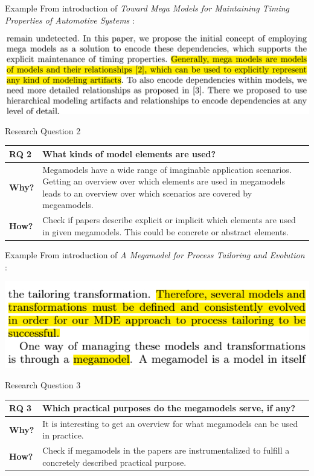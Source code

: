 \documentclass{beamer}
\begin{document}
\begin{frame}{Example}
From introduction of \textit{Toward Mega Models for Maintaining Timing Properties of Automotive Systems} \cite{Neumann_models2010}:
\begin{center}
\includegraphics[width=1.0\textwidth]{ex_rq1}
\end{center}
\end{frame}

\begin{frame}{Research Question 2}
\begin{tabular}{|l|p{9cm}|}\hline
\textbf{RQ 2} & What kinds of model elements are used?\\\hline
\textbf{Why?} & Megamodels have a wide range of imaginable application scenarios. Getting an overview over which elements are used in megamodels leads to an overview over which scenarios are covered by megeamodels.\\\hline
\textbf{How?} & Check if papers describe explicit or implicit which elements are used in given megamodels. This could be concrete or abstract elements.\\\hline
\end{tabular}
\end{frame}

\begin{frame}{Example}
From introduction of \textit{A Megamodel for Process Tailoring and Evolution} \cite{tailoring}:
\begin{center}
\includegraphics[width=1.0\textwidth]{ex_rq2}
\end{center}
\end{frame}

\begin{frame}{Research Question 3}
\begin{tabular}{|l|p{9cm}|}\hline
\textbf{RQ 3} & Which practical purposes do the megamodels serve, if any?\\\hline
\textbf{Why?} & It is interesting to get an overview for what megamodels can be used in practice.\\\hline
\textbf{How?} & Check if megamodels in the papers are 	instrumentalized to fulfill a concretely described practical purpose.\\\hline
\end{tabular}
\end{frame}
\end{document}

